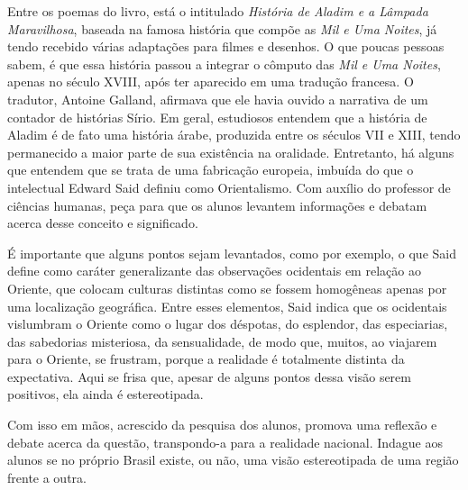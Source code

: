 \documentclass[12pt]{extarticle}
\begin{document}
Entre os poemas do livro, está o intitulado \emph{História
de Aladim e a Lâmpada Maravilhosa}, baseada na famosa história que
compõe as \emph{Mil e Uma Noites}, já tendo recebido várias adaptações
para filmes e desenhos. O que poucas pessoas sabem, é que essa história
passou a integrar o cômputo das \emph{Mil e Uma Noites}, apenas no
século XVIII, após ter aparecido em uma tradução francesa. O tradutor,
Antoine Galland, afirmava que ele havia ouvido a narrativa de um
contador de histórias Sírio. Em geral, estudiosos entendem que a
história de Aladim é de fato uma história árabe, produzida entre os
séculos VII e XIII, tendo permanecido a maior parte de sua existência na
oralidade. Entretanto, há alguns que entendem que se trata de uma
fabricação europeia, imbuída do que o intelectual Edward Said definiu
como Orientalismo. Com auxílio do professor de ciências humanas, peça
para que os alunos levantem informações e debatam acerca desse conceito
e significado.

É importante que alguns pontos sejam levantados, como por exemplo, o que
Said define como caráter generalizante das observações ocidentais em
relação ao Oriente, que colocam culturas distintas como se fossem
homogêneas apenas por uma localização geográfica. Entre esses elementos,
Said indica que os ocidentais vislumbram o Oriente como o lugar dos
déspotas, do esplendor, das especiarias, das sabedorias misteriosa, da
sensualidade, de modo que, muitos, ao viajarem para o Oriente, se
frustram, porque a realidade é totalmente distinta da expectativa. Aqui
se frisa que, apesar de alguns pontos dessa visão serem positivos, ela
ainda é estereotipada.

Com isso em mãos, acrescido da pesquisa dos alunos, promova uma reflexão
e debate acerca da questão, transpondo-a para a realidade nacional.
Indague aos alunos se no próprio Brasil existe, ou não, uma visão
estereotipada de uma região frente a outra.

\end{document}
